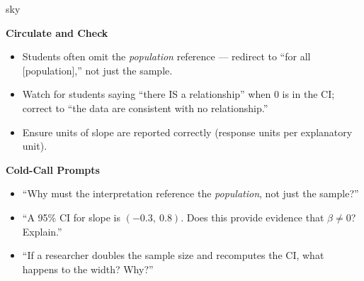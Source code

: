 \documentclass[10pt]{article}
\begin{document}
\begin{skillbox}{sky}
\begin{minipage}[t]{0.48\linewidth}
    \textbf{Circulate and Check}
    \begin{itemize}
        \item Students often omit the \emph{population} reference --- redirect to ``for all
              [population],'' not just the sample.
        \item Watch for students saying ``there IS a relationship'' when 0 is in the CI;
              correct to ``the data are consistent with no relationship.''
        \item Ensure units of slope are reported correctly (response units per explanatory unit).
    \end{itemize}
\end{minipage}
\hfill
\begin{minipage}[t]{0.48\linewidth}
    \textbf{Cold-Call Prompts}
    \begin{itemize}
        \item ``Why must the interpretation reference the \emph{population}, not just the
              sample?''
        \item ``A 95\% CI for slope is $(-0.3,\ 0.8)$. Does this provide evidence that
              $\beta \ne 0$? Explain.''
        \item ``If a researcher doubles the sample size and recomputes the CI, what happens
              to the width? Why?''
    \end{itemize}
\end{minipage}
\end{skillbox}
\end{document}
